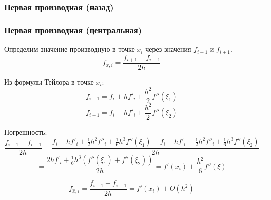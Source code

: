 \documentclass[10pt]{beamer}
\begin{document}
\begin{frame}[fragile]
\frametitle{Первая производная (назад)}

\begin{center}
\end{center}
\end{frame}

\begin{frame}[fragile]
\frametitle{Первая производная (центральная)}

Определим значение производную в точке $x_i$ через значения $f_{i-1}$ и $f_{i+1}$.
$$f_{x, i} = \frac{f_{i+1} - f_{i-1}}{2h}$$

Из формулы Тейлора в точке $x_i$:
$$f_{i+1} = f_i + h f'_i + \frac{h^2}{2} f''(\xi_1)$$
$$f_{i-1} = f_i - h f'_i + \frac{h^2}{2} f''(\xi_2)$$


Погрешность:
$$\frac{f_{i + 1} - f_{i - 1}}{2 h} = \frac{f_{i} + h f'_i + \frac12 h^2 f''_i + \frac16 h^3 f''(\xi_1) - f_{i} + h f'_i - \frac12 h^2 f''_i + \frac16 h^3 f''(\xi_2)}{2 h} = $$
$$ = \frac{2 h f'_i + \frac16 h^3 (f''(\xi_1) + f''(\xi_2))}{2 h} = f'(x_i) + \frac{h^2}{6} f''(\xi)$$

$$f_{\hat{x}, i} = \frac{f_{i + 1} - f_{i - 1}}{2 h} = f'(x_i) + O(h^2)$$

\end{frame}
\end{document}
